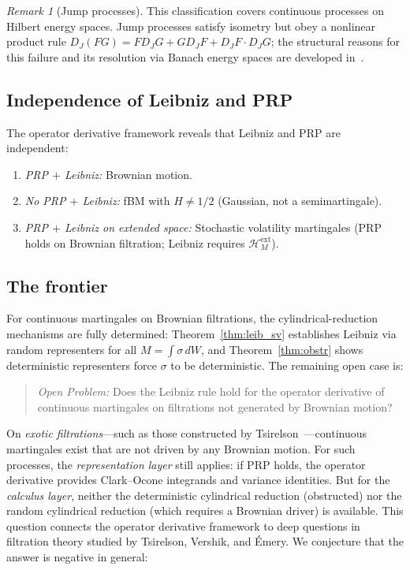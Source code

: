 \documentclass[11pt,a4paper]{article}
\theoremstyle{plain}
\theoremstyle{definition}
\theoremstyle{remark}
\newtheorem{remark}[theorem]{Remark}
\newcommand{\HM}{\mathcal{H}_M}
\begin{document}
\begin{remark}[Jump processes]
This classification covers continuous processes on Hilbert energy spaces. Jump processes satisfy isometry but obey a nonlinear product rule $D_J(FG) = FD_JG + GD_JF + D_JF \cdot D_JG$; the structural reasons for this failure and its resolution via Banach energy spaces are developed in~\cite{Fontes2026Banach}.
\end{remark}


\subsection{Independence of Leibniz and PRP}

The operator derivative framework reveals that Leibniz and PRP are independent:
\begin{enumerate}[label=(\roman*), leftmargin=2em]
\item \emph{PRP $+$ Leibniz:} Brownian motion.
\item \emph{No PRP $+$ Leibniz:} fBM with $H \neq 1/2$ (Gaussian, not a semimartingale).
\item \emph{PRP $+$ Leibniz on extended space:} Stochastic volatility martingales (PRP holds on Brownian filtration; Leibniz requires $\HM^{\mathrm{ext}}$).
\end{enumerate}


\subsection{The frontier}

For continuous martingales on Brownian filtrations, the cylindrical-reduction mechanisms are fully determined: Theorem~\ref{thm:leib_sv} establishes Leibniz via random representers for all $M = \int\sigma\,dW$, and Theorem~\ref{thm:obstr} shows deterministic representers force $\sigma$ to be deterministic. The remaining open case is:

\begin{quote}
\emph{Open Problem:} Does the Leibniz rule hold for the operator derivative of continuous martingales on filtrations not generated by Brownian motion?
\end{quote}

On \emph{exotic filtrations}---such as those constructed by Tsirelson~\cite{Tsirelson1975}---continuous martingales exist that are not driven by any Brownian motion. For such processes, the \emph{representation layer} still applies: if PRP holds, the operator derivative provides Clark--Ocone integrands and variance identities. But for the \emph{calculus layer}, neither the deterministic cylindrical reduction (obstructed) nor the random cylindrical reduction (which requires a Brownian driver) is available. This question connects the operator derivative framework to deep questions in filtration theory studied by Tsirelson, Vershik, and \'Emery. We conjecture that the answer is negative in general:
\end{document}
